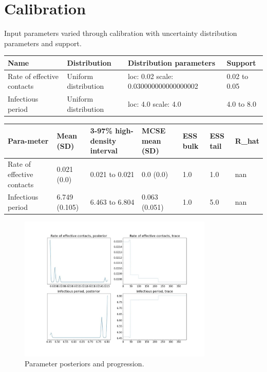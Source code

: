 \documentclass{article}%
\begin{document}
%
\section{Calibration}%
\label{sec:Calibration}%
Input parameters varied through calibration with uncertainty distribution parameters and support. \newline%
%
\begin{tabular}{p{2.7cm} p{2.7cm} p{2.7cm} p{2.7cm} }%
\hline%
\textbf{Name}&\textbf{Distribution}&\textbf{Distribution parameters}&\textbf{Support}\\%
\hline%
Rate of effective contacts&Uniform distribution&loc: 0.02 scale: 0.030000000000000002&0.02 to 0.05\\%
\hline%
Infectious period&Uniform distribution&loc: 4.0 scale: 4.0&4.0 to 8.0\\%
\hline%
\end{tabular}%
\linebreak%
\begin{tabular}{p{1.3cm} p{1.3cm} p{1.3cm} p{1.3cm} p{1.3cm} p{1.3cm} p{1.3cm} }%
\hline%
\textbf{Para{-}meter}&\textbf{Mean (SD)}&\textbf{3{-}97\% high{-}density interval}&\textbf{MCSE mean (SD)}&\textbf{ESS bulk}&\textbf{ESS tail}&\textbf{R\_hat}\\%
\hline%
Rate of effective contacts&0.021 (0.0)&0.021 to 0.021&0.0 (0.0)&1.0&1.0&nan\\%
\hline%
Infectious period&6.749 (0.105)&6.463 to 6.804&0.063 (0.051)&1.0&5.0&nan\\%
\hline%
\end{tabular}%
\linebreak%


\begin{figure}%
\centering%
\includegraphics[width=350px]{progression.jpg}%
\caption{Parameter posteriors and progression.}%
\end{figure}
\end{document}
